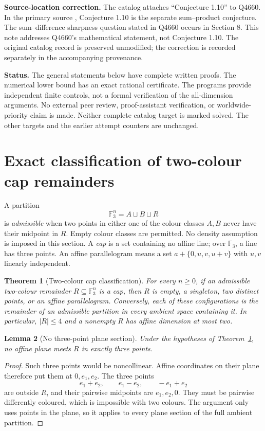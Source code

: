 \documentclass[11pt]{article}
\newtheorem{theorem}{Theorem}[section]
\newtheorem{lemma}[theorem]{Lemma}
\theoremstyle{remark}
\newcommand{\F}{\mathbb F_3}
\begin{document}
\textbf{Source-location correction.} The catalog attaches ``Conjecture 1.10''
to Q4660. In the primary source \cite{li}, Conjecture 1.10 is the separate
sum--product conjecture. The sum--difference sharpness question stated in
Q4660 occurs in Section 8. This note addresses Q4660's mathematical statement,
not Conjecture 1.10. The original catalog record is preserved unmodified;
the correction is recorded separately in the accompanying provenance.

\textbf{Status.} The general statements below have complete written proofs.
The numerical lower bound has an exact rational certificate. The programs
provide independent finite controls, not a formal verification of the
all-dimension arguments. No external peer review, proof-assistant
verification, or worldwide-priority claim is made. Neither complete catalog
target is marked solved. The other targets and the earlier attempt counters
are unchanged.

\section{Exact classification of two-colour cap remainders}

A partition
\[
 \F^n=A\sqcup B\sqcup R
\]
is \emph{admissible} when two points in either one of the colour classes
$A,B$ never have their midpoint in $R$. Empty colour classes are permitted.
No density assumption is imposed in this section. A \emph{cap} is a set
containing no affine line; over $\F$, a line has three points. An affine
parallelogram means a set $a+\{0,u,v,u+v\}$ with $u,v$ linearly independent.

\begin{theorem}[Two-colour cap classification]\label{thm:cap}
For every $n\geq0$, if an admissible two-colour remainder $R\subseteq\F^n$
is a cap, then $R$ is empty, a singleton, two distinct points, or an affine
parallelogram. Conversely, each of these configurations is the remainder
of an admissible partition in every ambient space containing it.
In particular, $|R|\leq4$ and a nonempty $R$ has affine dimension at most two.
\end{theorem}

\begin{lemma}[No three-point plane section]\label{lem:three}
Under the hypotheses of Theorem~\ref{thm:cap}, no affine plane meets $R$
in exactly three points.
\end{lemma}
\begin{proof}
Such three points would be noncollinear. Affine coordinates on their plane
therefore put them at $0,e_1,e_2$. The three points
\[
 e_1+e_2,\qquad e_1-e_2,\qquad -e_1+e_2
\]
are outside $R$, and their pairwise midpoints are $e_1,e_2,0$.
They must be pairwise differently coloured, which is impossible with two
colours. The argument only uses points in the plane, so it applies to every
plane section of the full ambient partition.
\end{proof}
\end{document}
